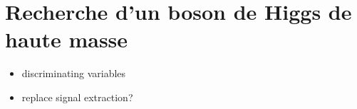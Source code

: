 \chapter{Recherche d'un boson de Higgs de haute masse}\label{chapter-HTT_analysis}








\begin{itemize}
\item discriminating variables
\item replace signal extraction?
\end{itemize}




